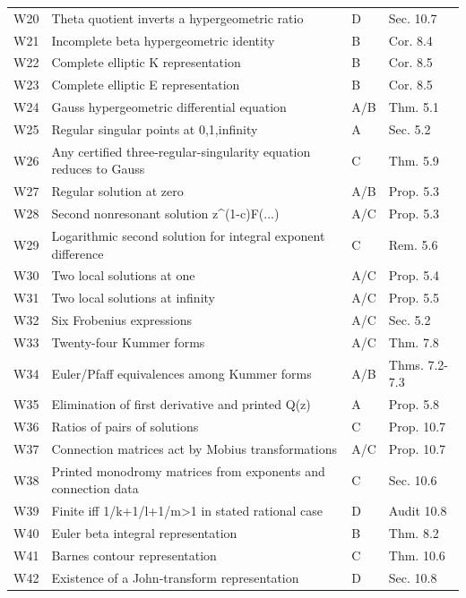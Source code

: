 \begin{longtable}{@{}p{}p{}p{}p{}@{}}
W20 & Theta quotient inverts a hypergeometric ratio & \textsf{D} & Sec. 10.7 \\
W21 & Incomplete beta hypergeometric identity & \textsf{B} & Cor. 8.4 \\
W22 & Complete elliptic K representation & \textsf{B} & Cor. 8.5 \\
W23 & Complete elliptic E representation & \textsf{B} & Cor. 8.5 \\
W24 & Gauss hypergeometric differential equation & \textsf{A/B} & Thm. 5.1 \\
W25 & Regular singular points at 0,1,infinity & \textsf{A} & Sec. 5.2 \\
W26 & Any certified three-regular-singularity equation reduces to Gauss & \textsf{C} & Thm. 5.9 \\
W27 & Regular solution at zero & \textsf{A/B} & Prop. 5.3 \\
W28 & Second nonresonant solution z\textasciicircum{}(1-c)F(...)  & \textsf{A/C} & Prop. 5.3 \\
W29 & Logarithmic second solution for integral exponent difference & \textsf{C} & Rem. 5.6 \\
W30 & Two local solutions at one & \textsf{A/C} & Prop. 5.4 \\
W31 & Two local solutions at infinity & \textsf{A/C} & Prop. 5.5 \\
W32 & Six Frobenius expressions & \textsf{A/C} & Sec. 5.2 \\
W33 & Twenty-four Kummer forms & \textsf{A/C} & Thm. 7.8 \\
W34 & Euler/Pfaff equivalences among Kummer forms & \textsf{A/B} & Thms. 7.2-7.3 \\
W35 & Elimination of first derivative and printed Q(z) & \textsf{A} & Prop. 5.8 \\
W36 & Ratios of pairs of solutions & \textsf{C} & Prop. 10.7 \\
W37 & Connection matrices act by Mobius transformations & \textsf{A/C} & Prop. 10.7 \\
W38 & Printed monodromy matrices from exponents and connection data & \textsf{C} & Sec. 10.6 \\
W39 & Finite iff 1/k+1/l+1/m>1 in stated rational case & \textsf{D} & Audit 10.8 \\
W40 & Euler beta integral representation & \textsf{B} & Thm. 8.2 \\
W41 & Barnes contour representation & \textsf{C} & Thm. 10.6 \\
W42 & Existence of a John-transform representation & \textsf{D} & Sec. 10.8 \\

\end{longtable}
